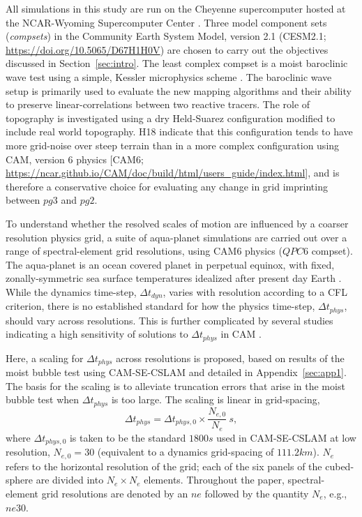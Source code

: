 \documentclass{agujournal}
\begin{document}
All simulations in this study are run on the Cheyenne supercomputer hosted at the NCAR-Wyoming Supercomputer Center \citep{AMPproj}. Three model component sets ({\em{compsets}}) in the Community Earth System Model, version 2.1 (CESM2.1; \url{https://doi.org/10.5065/D67H1H0V}) are chosen to carry out the objectives discussed in Section~\ref{sec:intro}. The least complex compset is a moist baroclinic wave test using a simple, Kessler microphysics scheme \citep[$FKESSLER$ compset;][]{LetAl2018JAMES}. The baroclinic wave setup is primarily used to evaluate the new mapping algorithms and their ability to preserve linear-correlations between two reactive tracers. The role of topography is investigated using a dry Held-Suarez configuration \citep[$FHS94$ compset;][]{HS1994} modified to include real world topography. H18 indicate that this configuration tends to have more grid-noise over steep terrain than in a more complex configuration using CAM, version 6 physics [CAM6; \url{https://ncar.github.io/CAM/doc/build/html/users_guide/index.html}], and is therefore a conservative choice for evaluating any change in grid imprinting between $pg3$ and $pg2$. 

To understand whether the resolved scales of motion are influenced by a coarser resolution physics grid, a suite of aqua-planet simulations \citep{NH2000ASL,MWO2016JAMES} are carried out over a range of spectral-element grid resolutions, using CAM6 physics ($QPC6$ compset). The aqua-planet is an ocean covered planet in perpetual equinox, with fixed, zonally-symmetric sea surface temperatures idealized after present day Earth \citep[$QOBS$ in][]{NH2000ASL}. While the dynamics time-step, $\Delta t_{dyn}$, varies with resolution according to a CFL criterion, there is no established standard for how the physics time-step, $\Delta t_{phys}$, should vary across resolutions. This is further complicated by several studies indicating a high sensitivity of solutions to $\Delta t_{phys}$ in CAM  \citep{WO2003QJR,W2013QJRMS,WETAL2015JAMES,HR2018JAMES}.

Here, a scaling for $\Delta t_{phys}$ across resolutions is proposed, based on results of the moist bubble test \citep{HR2018JAMES} using CAM-SE-CSLAM and detailed in Appendix~\ref{sec:app1}. The basis for the scaling is to alleviate truncation errors that arise in the moist bubble test when $\Delta t_{phys}$ is too large. The scaling is linear in grid-spacing,
\begin{equation}
\Delta t_{phys} = \Delta t_{phys,0} \times \frac{N_{e,0}}{N_e}~s,\label{eq:dt-scale}
\end{equation}
where $\Delta t_{phys,0}$ is taken to be the standard $1800 s$ used in CAM-SE-CSLAM at low resolution, $N_{e,0} = 30$ (equivalent to a dynamics grid-spacing of $111.2km$). $N_e$ refers to the horizontal resolution of the grid; each of the six panels of the cubed-sphere are divided into $N_e \times N_e$ elements. Throughout the paper, spectral-element grid resolutions are denoted by an $ne$ followed by the quantity $N_e$, e.g., $ne30$.
\end{document}
